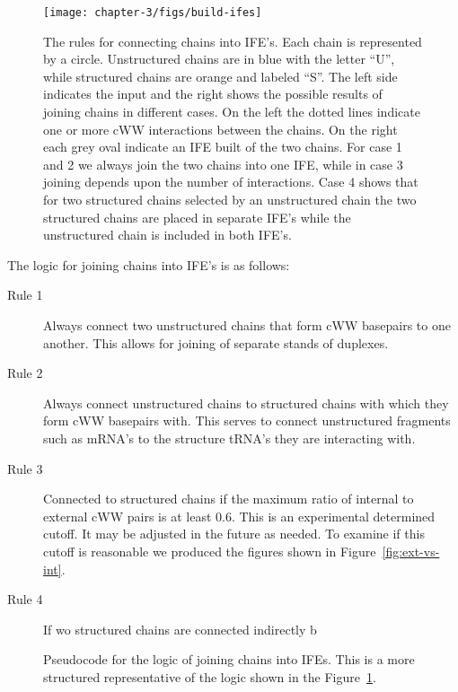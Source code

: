 \begin{figure}
  \texttt{[image: chapter-3/figs/build-ifes]}
  \caption{The rules for connecting chains into IFE's. Each chain is
    represented by a circle. Unstructured chains are in blue with the letter
    ``U'', while structured chains are orange and labeled ``S''. The left side
    indicates the input and the right shows the possible results of joining
    chains in different cases. On the left the dotted lines indicate one or more
    cWW interactions between the chains. On the right each grey oval indicate
    an IFE built of the two chains. For case 1 and 2 we always join the two
    chains into one IFE, while in case 3 joining depends upon the number of
    interactions. Case 4 shows that for two structured chains selected by an
    unstructured chain the two structured chains are placed in separate IFE's
    while the unstructured chain is included in both IFE's.}
  \label{fig:build-ife}
\end{figure}

The logic for joining chains into IFE's is as follows:

\begin{description}
  \item[Rule 1] Always connect two unstructured chains that form cWW basepairs
    to one another. This
    allows for joining of separate stands of duplexes.

  \item[Rule 2] Always connect unstructured chains to structured chains with
    which they form cWW basepairs with. This serves to connect unstructured
    fragments such as mRNA's to the structure tRNA's they are interacting with.

  \item[Rule 3] Connected to structured chains if the maximum ratio of internal
    to external cWW pairs is at least 0.6. This is an experimental determined
    cutoff. It may be adjusted in the future as needed. To examine if this
    cutoff is reasonable we produced the figures shown in
    Figure~\ref{fig:ext-vs-int}.

  \item[Rule 4] If wo structured chains are connected indirectly b
\end{description}

\begin{figure}
  \caption{Pseudocode for the logic of joining chains into IFEs. This is a more
  structured representative of the logic shown in the Figure~\ref{fig:build-ife}.
  }
  \label{fig:pseudo-ife-building}
\end{figure}

